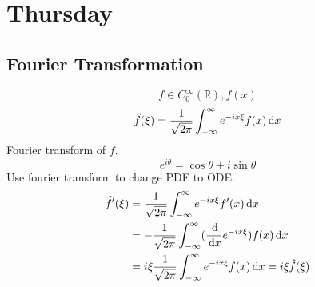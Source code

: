 
\section{Thursday}
\subsection{Fourier Transformation}
\[f \in C_0^\infty(\mathbb{R}), f(x)
\]
\[\hat{f}(\xi)=\frac{1}{\sqrt{2\pi}}\int_{-\infty}^\infty e^{-ix\xi}f(x)\,\mathrm{d} x
\]
Fourier transform of $f$.\\
\[e^{i\theta}=\cos\theta+i\sin\theta
\]
Use fourier transform to change PDE to ODE.
\[\begin{aligned}\widehat{f}^{\prime}(\xi)&=\frac{1}{\sqrt{2\pi}}\int_{-\infty}^\infty e^{-ix\xi}f^{\prime}(x)\,\mathrm{d} x\\
&=-\frac{1}{\sqrt{2\pi}}\int_{-\infty}^\infty(\frac{\,\mathrm{d}}{\,\mathrm{d} x}e^{-ix\xi})f(x)\,\mathrm{d} x\\
&=i\xi\frac{1}{\sqrt{2\pi}}\int_{-\infty}^\infty e^{-ix\xi}f(x)\,\mathrm{d} x=i\xi \hat{f}(\xi)
\end{aligned}
\]

